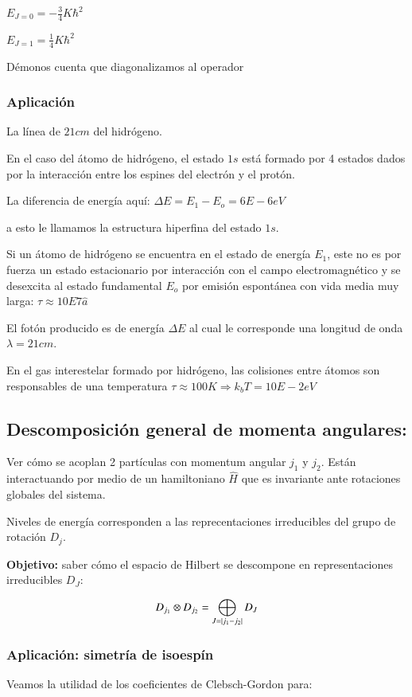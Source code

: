 $E_{J=0}=-\frac{3}{4}K\hbar^2$

$E_{J=1}=\frac{1}{4}K\hbar^2$

Démonos cuenta que diagonalizamos al operador 


\subsubsection{Aplicación}
La línea de $21cm$ del hidrógeno. 

En el caso del átomo de hidrógeno, el estado $1s$ está formado por 4 estados dados por la interacción entre los espines del electrón y el protón.

La diferencia de energía aquí: $\Delta E = E_1-E_o=6E-6eV$

a esto le llamamos la estructura hiperfina del estado $1s$.

Si un átomo de hidrógeno se encuentra en el estado de energía $E_1$, este no es por fuerza un estado estacionario por interacción con el campo electromagnético y se desexcita al estado fundamental $E_o$ por emisión espontánea con vida media muy larga: $\tau \approx 10E7\hat{a}$

El fotón producido es de energía $\Delta E $ al cual le corresponde una longitud de onda $\lambda=21cm$.

En el gas interestelar formado por hidrógeno, las colisiones entre átomos son responsables de una temperatura $\tau\approx100K\Rightarrow k_bT=10E-2eV$

\subsection{Descomposición general de momenta angulares:}

Ver cómo se acoplan 2 partículas con momentum angular $j_1$ y $j_2$. Están interactuando por medio de un hamiltoniano $\hat{H}$ que es invariante ante rotaciones globales del sistema.


Niveles de energía corresponden a las reprecentaciones irreducibles del grupo de rotación $D_j$. 

\textbf{Objetivo:} saber cómo el espacio de Hilbert se descompone en representaciones irreducibles $D_J$:


\begin{align*}
    D_{j_1}\otimes D_{j_2}=\bigoplus_{J=\abs{j_1-j_2}}D_J
\end{align*}



\subsubsection{Aplicación: simetría de isoespín}
Veamos la utilidad de los coeficientes de Clebsch-Gordon para:

